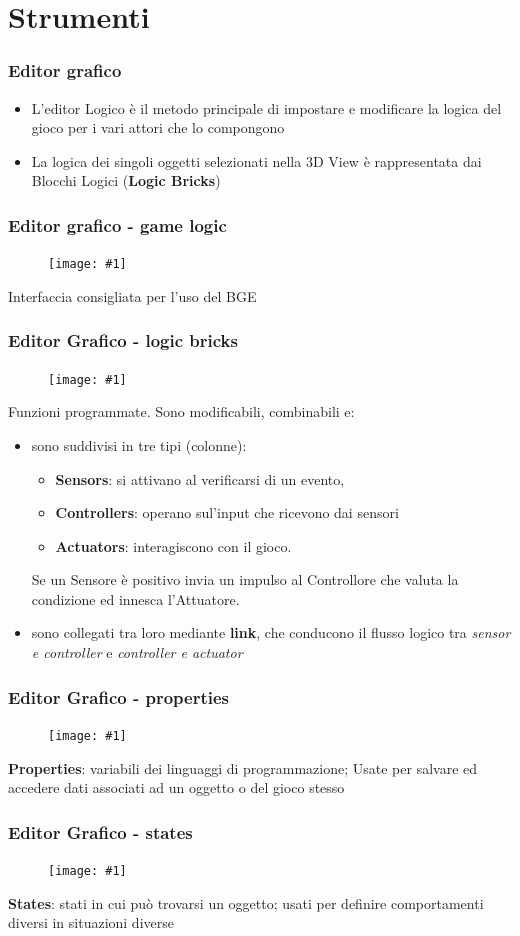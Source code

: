\documentclass{beamer}
\def\image[#1][#2]{
	\begin{figure}[H]
		\centering
		\texttt{[image: \#1]}
\end{figure}}
\begin{document}
	\section{Strumenti}
		\begin{frame}
			\frametitle{Editor grafico}
			\begin{itemize}
				\item L'editor Logico è il metodo principale di impostare e modificare la logica del gioco per i vari attori che lo compongono
				\item La logica dei singoli oggetti selezionati nella 3D View è rappresentata dai Blocchi Logici (\textbf{Logic Bricks})
			\end{itemize}
		\end{frame}
		\begin{frame}
			\frametitle{Editor grafico - game logic}
			\image[images/gamegui.png][scale=0.16]
			Interfaccia consigliata per l'uso del BGE
		\end{frame}
		\begin{frame}
			\frametitle{Editor Grafico - logic bricks}
			\image[images/logic_bricks.png][scale=0.27]
			Funzioni programmate. Sono modificabili, combinabili e:
				\begin{itemize}
					\item sono suddivisi in tre tipi (colonne): 
					\begin{itemize}
						\item\textbf{Sensors}: \footnotesize si attivano al verificarsi di un evento, 
						\item \textbf{Controllers}: \footnotesize operano sul'input che ricevono dai sensori
						\item \textbf{Actuators}: \footnotesize interagiscono con il gioco.
					\end{itemize}
						Se un Sensore è positivo invia un impulso al Controllore che valuta la condizione ed innesca l’Attuatore.
						\item sono collegati tra loro mediante \textbf{link}, che conducono il flusso logico tra \textit{sensor e controller} e \textit{controller e actuator}
					\end{itemize}
		\end{frame}
		\begin{frame}
			\frametitle{Editor Grafico - properties}
			\image[images/props.png][scale=0.4]
			\textbf{Properties}: variabili dei linguaggi di programmazione; Usate per salvare ed accedere dati associati ad un oggetto o del gioco stesso
		\end{frame}
		\begin{frame}
			\frametitle{Editor Grafico - states}
			\image[images/states.png][scale=0.3]
			\textbf{States}: stati in cui può trovarsi un oggetto; usati per definire comportamenti diversi in situazioni diverse %
		\end{frame}
\end{document}
